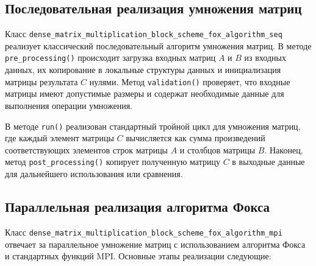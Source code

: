\documentclass{report}
\begin{document}
\subsection*{Последовательная реализация умножения матриц}

Класс \texttt{dense\_matrix\_multiplication\_block\_scheme\_fox\_algorithm\_seq} реализует классический последовательный алгоритм умножения матриц. В методе \texttt{pre\_processing()} происходит загрузка входных матриц $A$ и $B$ из входных данных, их копирование в локальные структуры данных и инициализация матрицы результата $C$ нулями. Метод \texttt{validation()} проверяет, что входные матрицы имеют допустимые размеры и содержат необходимые данные для выполнения операции умножения.

В методе \texttt{run()} реализован стандартный тройной цикл для умножения матриц, где каждый элемент матрицы $C$ вычисляется как сумма произведений соответствующих элементов строк матрицы $A$ и столбцов матрицы $B$. Наконец, метод \texttt{post\_processing()} копирует полученную матрицу $C$ в выходные данные для дальнейшего использования или сравнения.

\subsection*{Параллельная реализация алгоритма Фокса}

Класс \texttt{dense\_matrix\_multiplication\_block\_scheme\_fox\_algorithm\_mpi} отвечает за параллельное умножение матриц с использованием алгоритма Фокса и стандартных функций MPI. Основные этапы реализации следующие:
\end{document}
